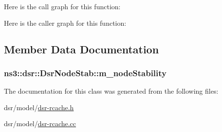 Here is the call graph for this function\+:




Here is the caller graph for this function\+:




\subsection{Member Data Documentation}
\subsubsection[{\texorpdfstring{m\+\_\+node\+Stability}{m_nodeStability}}]{ ns3\+::dsr\+::\+Dsr\+Node\+Stab\+::m\+\_\+node\+Stability\hspace{0.3cm}{\ttfamily [private]}}\hypertarget{classns3_1_1dsr_1_1DsrNodeStab_a2b6eb24deba1383c90c5e67fd40b3594}{}\label{classns3_1_1dsr_1_1DsrNodeStab_a2b6eb24deba1383c90c5e67fd40b3594}


The documentation for this class was generated from the following files\+:\begin{DoxyCompactItemize}
\item 
dsr/model/\hyperlink{dsr-rcache_8h}{dsr-\/rcache.\+h}\item 
dsr/model/\hyperlink{dsr-rcache_8cc}{dsr-\/rcache.\+cc}\end{DoxyCompactItemize}
